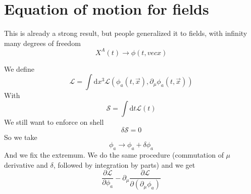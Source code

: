 \documentclass[a4paper]{book}
\theoremstyle{definition}
\theoremstyle{remark}
\begin{document}
\section{Equation of motion for fields}

This is already a strong result, but people generalized it to fields, with infinity many degrees of freedom 
\begin{equation}
    X^A(t) \rightarrow \phi (t, vec{x})
\end{equation}

We define 
\begin{equation}
    \mathcal{L} = \int \text{d} x^3 \mathcal{L}(\phi _a(t, \vec{x}), \partial_\mu \phi_a(t, \vec{x}))
\end{equation}
With 
\begin{equation}
    \mathcal{S} = \int \text{d}t \mathcal{L}(t)
\end{equation}
We still want to enforce on shell 
\begin{equation}
    \delta \mathcal{S} = 0
\end{equation}
So we take 
\begin{equation}
    \phi_a \rightarrow \phi_a + \delta \phi_a 
\end{equation}
And we fix the extremum. We do the same procedure (commutation of $\mu$ derivative and $\delta$, followed by integration by parts) and we get 
\begin{equation}
    \frac{\partial \mathcal{L}}{\partial \phi_a} - \partial_\mu \frac{\partial \mathcal{L}}{\partial (\partial_\mu \phi_a)}
\end{equation}
\end{document}
